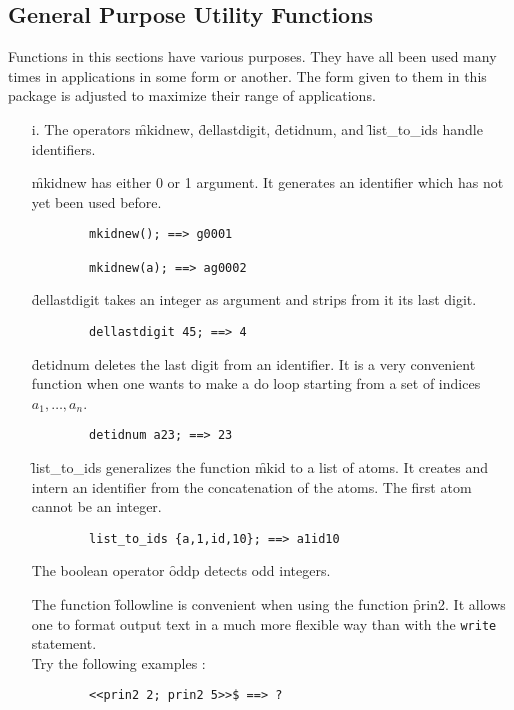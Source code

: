 \subsection{General Purpose Utility Functions}
Functions in this sections have various purposes. They have all been used
many times in applications in some form or another. The form given
to them in this package is adjusted to maximize their range of applications.
\begin{itemize}
\item[i.]
\hypertarget{operator:MKIDNEW}{}
\hypertarget{operator:DELLASTDIGIT}{}
\hypertarget{operator:DETIDNUM}{}
\hypertarget{operator:LIST_TO_IDS}{}
\hypertarget{operator:MKIDNEW}{}
\hypertarget{operator:DELLASTDIGIT}{}
\hypertarget{operator:DETIDNUM}{}
\hypertarget{operator:LIST_TO_IDS}{}
The operators \f{mkidnew}, \f{dellastdigit}, \f{detidnum}, and \f{list\_to\_ids}
handle identifiers. 

\f{mkidnew} has either 0 or 1 argument. 
It generates an identifier which has not yet been used before.
\begin{verbatim}
        mkidnew(); ==> g0001

        mkidnew(a); ==> ag0002
\end{verbatim}
\f{dellastdigit} takes an integer as argument and strips from it its last
digit.
\begin{verbatim}
        dellastdigit 45; ==> 4
\end{verbatim}
\f{detidnum} deletes the last digit from an
identifier. It is a very convenient function when one wants to make a do
loop starting from a set of indices $ a_1, \ldots , a_{n} $.
\begin{verbatim}
        detidnum a23; ==> 23
\end{verbatim}

\f{list\_to\_ids} generalizes the function \f{mkid} to a list of
atoms. It creates and intern an identifier from the concatenation of
the atoms. The first atom cannot be an integer.
\begin{verbatim}
        list_to_ids {a,1,id,10}; ==> a1id10
\end{verbatim}
\hypertarget{operator:ODDP}{}
The boolean operator \f{oddp}  detects odd integers.

\hypertarget{operator:FOLLOWLINE}{}
The function \f{followline} is convenient when using the function \f{prin2}.
It allows one to format output text in a much more flexible way than with
the \texttt{write} statement. \\
Try the following examples :
\begin{verbatim}
        <<prin2 2; prin2 5>>$ ==> ?


\end{verbatim}
\end{itemize}

